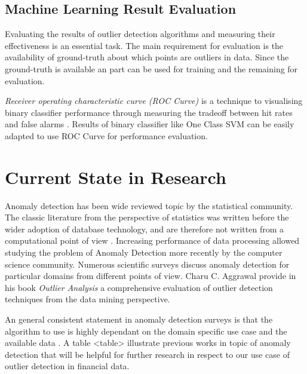 \subsection{Machine Learning Result Evaluation}

Evaluating the results of outlier detection algorithms and measuring their effectiveness is an essential task. The main requirement for evaluation is the availability of ground-truth about which points are outliers in data. Since the ground-truth is available an part can be used for training and the remaining for evaluation. 

\textit{Receiver operating characteristic curve (ROC Curve) } is a technique to visualising binary classifier performance through measuring the tradeoff between hit rates and false alarms \cite{Fawcett:2006:IRA:1159473.1159475}. Results of binary classifier like One Class SVM can be easily adapted to use ROC Curve for performance evaluation. %

\section{Current State in Research}

Anomaly detection has been wide reviewed topic by the statistical community. The classic literature from the perspective of statistics \cite{Hawkins:1980,Barnett:1978} was written before the wider adoption of database technology, and are therefore not written from a computational point of view \cite{Aggarwal:2013}.
Increasing performance of data processing allowed studying the problem of Anomaly Detection more recently by the computer science community. Numerous scientific surveys \cite{Agyemang:2006:CSN:1609942.1609946,Chandola:2009:ADS:1541880.1541882,Chandola:2012:ADD:2197072.2197116,Pimentel:2014:RRN:2588908.2589196} discuss anomaly detection for particular domains from different points of view. Charu C. Aggrawal provide in his book \textit{Outlier Analysis} \cite{Aggarwal:2013} a comprehensive evaluation of outlier detection techniques from the data mining perspective.

An general consistent statement in anomaly detection surveys is that the algorithm to use is highly dependant on the domain specific use case and the available data \cite{Agyemang:2006:CSN:1609942.1609946,Chandola:2009:ADS:1541880.1541882,Chandola:2012:ADD:2197072.2197116,Pimentel:2014:RRN:2588908.2589196}. A table <table> illustrate previous works in topic of anomaly detection that will be helpful for further research in respect to our use case of outlier detection in financial data.



